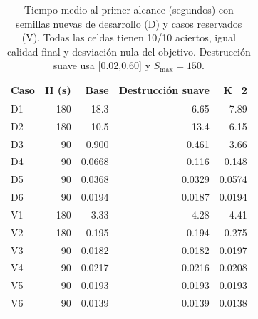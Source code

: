 \begin{table}[tbp]
\centering\small
\caption{Tiempo medio al primer alcance (segundos) con semillas nuevas de desarrollo (D) y casos reservados (V). Todas las celdas tienen 10/10 aciertos, igual calidad final y desviación nula del objetivo. Destrucción suave usa [0.02,0.60] y $S_{\mathrm{max}}=150$.}
\label{tab:confirmation}
\begin{tabular}{lrrrr}
\toprule
Caso & H (s) & Base & Destrucción suave & K=2\\
\midrule
D1 & 180 & 18.3 & 6.65 & 7.89\\
D2 & 180 & 10.5 & 13.4 & 6.15\\
D3 & 90 & 0.900 & 0.461 & 3.66\\
D4 & 90 & 0.0668 & 0.116 & 0.148\\
D5 & 90 & 0.0368 & 0.0329 & 0.0574\\
D6 & 90 & 0.0194 & 0.0187 & 0.0194\\
\midrule
V1 & 180 & 3.33 & 4.28 & 4.41\\
V2 & 180 & 0.195 & 0.194 & 0.275\\
V3 & 90 & 0.0182 & 0.0182 & 0.0197\\
V4 & 90 & 0.0217 & 0.0216 & 0.0208\\
V5 & 90 & 0.0193 & 0.0193 & 0.0193\\
V6 & 90 & 0.0139 & 0.0139 & 0.0138\\
\bottomrule
\end{tabular}
\end{table}
